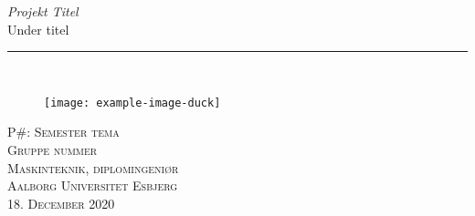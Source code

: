 %
%
%
%
\thispagestyle{empty}
\begin{flushright}
\vspace{3cm}

\phantom{hul}

\phantom{hul}

\phantom{hul}

\textsl{\Huge Projekt Titel} \\ 
\large Under titel \vspace{1cm}

\rule{13cm}{3mm} \\ \vspace{1.5cm}
\vspace{1cm}

\begin{center}

\begin{figure}[H]
  \centering
 \texttt{[image: example-image-duck]}
\end{figure}
    

\end{center}

\vspace{2cm} 
\textsc{\Large P\#: Semester tema \\ %
Gruppe nummer \\ %
Maskinteknik, diplomingeniør\\ %
Aalborg Universitet Esbjerg\\
18. December 2020\\} %
\end{flushright}
